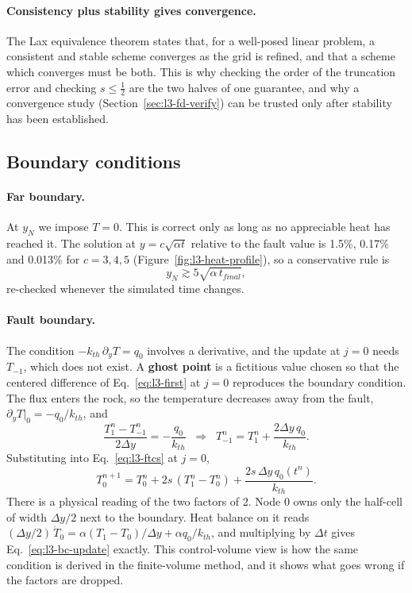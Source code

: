 \paragraph{Consistency plus stability gives convergence.} The Lax equivalence theorem states that, for a well-posed linear problem, a consistent and stable scheme converges as the grid is refined, and that a scheme which converges must be both. This is why checking the order of the truncation error and checking $s\le\frac12$ are the two halves of one guarantee, and why a convergence study (Section~\ref{sec:l3-fd-verify}) can be trusted only after stability has been established.

\subsection{Boundary conditions}
\label{sec:l3-fd-bc}

\paragraph{Far boundary.} At $y_N$ we impose $T=0$. This is correct only as long as no appreciable heat has reached it. The solution at $y=c\sqrt{\alpha t}$ relative to the fault value is 1.5\%, 0.17\% and 0.013\% for $c=3,4,5$ (Figure~\ref{fig:l3-heat-profile}), so a conservative rule is
\begin{equation}
y_N\gtrsim5\sqrt{\alpha\,t_{final}},
\label{eq:l3-domain}
\end{equation}
re-checked whenever the simulated time changes.

\paragraph{Fault boundary.} The condition $-k_{th}\,\partial_yT=q_0$ involves a derivative, and the update at $j=0$ needs $T_{-1}$, which does not exist. A \textbf{ghost point} is a fictitious value chosen so that the centered difference of Eq.~\eqref{eq:l3-first} at $j=0$ reproduces the boundary condition. The flux enters the rock, so the temperature decreases away from the fault, $\partial_yT|_0=-q_0/k_{th}$, and
\begin{equation}
\frac{T_1^n-T_{-1}^n}{2\Delta y}=-\frac{q_0}{k_{th}}\;\;\Longrightarrow\;\;T_{-1}^n=T_1^n+\frac{2\Delta y\,q_0}{k_{th}}.
\end{equation}
Substituting into Eq.~\eqref{eq:l3-ftcs} at $j=0$,
\begin{equation}
T_0^{n+1}=T_0^n+2s\,(T_1^n-T_0^n)+\frac{2s\,\Delta y\,q_0(t^n)}{k_{th}}.
\label{eq:l3-bc-update}
\end{equation}
There is a physical reading of the two factors of 2. Node 0 owns only the half-cell of width $\Delta y/2$ next to the boundary. Heat balance on it reads $(\Delta y/2)\,\dot T_0=\alpha(T_1-T_0)/\Delta y+\alpha q_0/k_{th}$, and multiplying by $\Delta t$ gives Eq.~\eqref{eq:l3-bc-update} exactly. This control-volume view is how the same condition is derived in the finite-volume method, and it shows what goes wrong if the factors are dropped.

